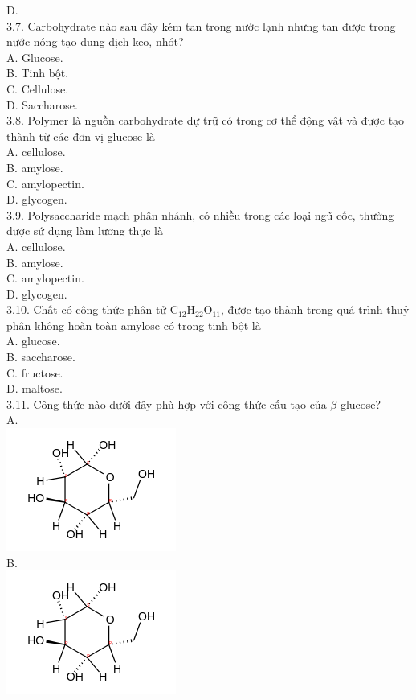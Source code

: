 \documentclass[10pt]{article}
\begin{document}
D.\\
3.7. Carbohydrate nào sau đây kém tan trong nước lạnh nhưng tan được trong nước nóng tạo dung dịch keo, nhót?\\
A. Glucose.\\
B. Tinh bột.\\
C. Cellulose.\\
D. Saccharose.\\
3.8. Polymer là nguồn carbohydrate dự trữ có trong cơ thể động vật và được tạo thành từ các đơn vị glucose là\\
A. cellulose.\\
B. amylose.\\
C. amylopectin.\\
D. glycogen.\\
3.9. Polysaccharide mạch phân nhánh, có nhiều trong các loại ngũ cốc, thường được sứ dụng làm lương thực là\\
A. cellulose.\\
B. amylose.\\
C. amylopectin.\\
D. glycogen.\\
3.10. Chất có công thức phân tử $\mathrm{C}_{12} \mathrm{H}_{22} \mathrm{O}_{11}$, được tạo thành trong quá trình thuỷ phân không hoàn toàn amylose có trong tinh bột là\\
A. glucose.\\
B. saccharose.\\
C. fructose.\\
D. maltose.\\
3.11. Công thức nào dưới đây phù hợp với công thức cấu tạo của $\beta$-glucose?\\
A.\\
\includegraphics{smile-2403dbcd7d1a61a4bdaa5dd733569fd10be306e0}\\
B.\\
\includegraphics{smile-3798e02ee97051ea8743e970129d950e145b8a2a}\\
\end{document}
